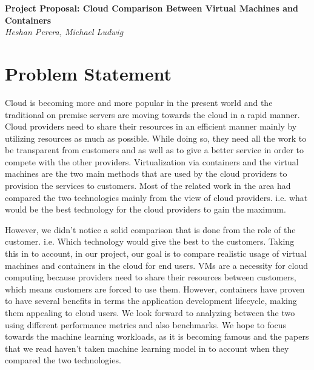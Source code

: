 \documentclass[11pt]{article}
\begin{document}
\renewcommand{\headrulewidth}{0pt} 
\renewcommand{\footrulewidth}{0pt} 
\pagestyle{fancy}
\cfoot{}
\lhead{}
\rhead{}
\lfoot{\itshape\textcolor{gray}{CS525T Cloud Computing Paper Review}}

\begin{center}
{\LARGE \bf Project Proposal: Cloud Comparison Between Virtual Machines and Containers} \\
{\normalsize \emph{Heshan Perera, Michael Ludwig}}\\

\end{center}

\section{Problem Statement}


Cloud is becoming more and more popular in the present world and the traditional on premise servers are moving towards the cloud in a rapid manner. Cloud providers need to share their resources in an efficient manner mainly by utilizing resources as much as possible. While doing so, they need all the work to be transparent from customers and as well as to give a better service in order to compete with the other providers. Virtualization via containers and the virtual machines are the two main methods that are used by the cloud providers to provision the services to customers. Most of the related work in the area had compared the two technologies mainly from the view of cloud providers. i.e. what would be the best technology for the cloud providers to gain the maximum. 

However, we didn't notice a solid comparison that is done from the role of the customer. i.e. Which technology would give the best to the customers. Taking this in to account, in our project, our goal is to compare realistic usage of virtual machines and containers in the cloud for end users. VMs are a necessity for cloud computing because providers need to share their resources between customers, which means customers are forced to use them. However, containers have proven to have several benefits in terms the application development lifecycle, making them appealing to cloud users. We look forward to analyzing between the two using different performance metrics and also benchmarks. We hope to focus towards the machine learning workloads, as it is becoming famous and the papers that we read haven't taken machine learning model in to account when they compared the two technologies. 
\end{document}
